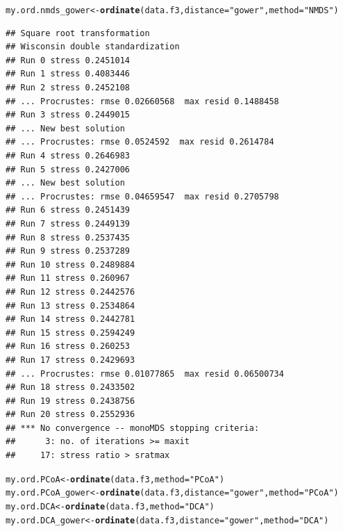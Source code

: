 \documentclass[12pt]{article}\usepackage[]{graphicx}\usepackage[]{color}
\makeatletter
\newcommand{\hlstr}[1]{\textcolor[rgb]{0.192,0.494,0.8}{#1}}%
\newcommand{\hlstd}[1]{\textcolor[rgb]{0.345,0.345,0.345}{#1}}%
\newcommand{\hlkwb}[1]{\textcolor[rgb]{0.69,0.353,0.396}{#1}}%
\newcommand{\hlkwc}[1]{\textcolor[rgb]{0.333,0.667,0.333}{#1}}%
\newcommand{\hlkwd}[1]{\textcolor[rgb]{0.737,0.353,0.396}{\textbf{#1}}}%
\newenvironment{kframe}{%
 \def\at@end@of@kframe{}%
 \ifinner\ifhmode%
  \def\at@end@of@kframe{\end{minipage}}%
  \begin{minipage}{\columnwidth}%
 \fi\fi%
 \def\FrameCommand##1{\hskip\@totalleftmargin \hskip-\fboxsep
 \colorbox{shadecolor}{##1}\hskip-\fboxsep
     \hskip-\linewidth \hskip-\@totalleftmargin \hskip\columnwidth}%
 \MakeFramed {\advance\hsize-\width
   \@totalleftmargin\z@ \linewidth\hsize
   \@setminipage}}%
 {\par\unskip\endMakeFramed%
 \at@end@of@kframe}
\newenvironment{knitrout}{}{} %
\numberwithin{figure}{section}
\makeatother
\begin{document}
\begin{knitrout}\small
{}\color{fgcolor}\begin{kframe}
\begin{alltt}
\hlstd{my.ord.nmds_gower} \hlkwb{<-} \hlkwd{ordinate}\hlstd{(data.f3,} \hlkwc{distance} \hlstd{=} \hlstr{"gower"}\hlstd{,}  \hlkwc{method} \hlstd{=} \hlstr{"NMDS"}\hlstd{)}
\end{alltt}
\begin{verbatim}
## Square root transformation
## Wisconsin double standardization
## Run 0 stress 0.2451014 
## Run 1 stress 0.4083446 
## Run 2 stress 0.2452108 
## ... Procrustes: rmse 0.02660568  max resid 0.1488458 
## Run 3 stress 0.2449015 
## ... New best solution
## ... Procrustes: rmse 0.0524592  max resid 0.2614784 
## Run 4 stress 0.2646983 
## Run 5 stress 0.2427006 
## ... New best solution
## ... Procrustes: rmse 0.04659547  max resid 0.2705798 
## Run 6 stress 0.2451439 
## Run 7 stress 0.2449139 
## Run 8 stress 0.2537435 
## Run 9 stress 0.2537289 
## Run 10 stress 0.2489884 
## Run 11 stress 0.260967 
## Run 12 stress 0.2442576 
## Run 13 stress 0.2534864 
## Run 14 stress 0.2442781 
## Run 15 stress 0.2594249 
## Run 16 stress 0.260253 
## Run 17 stress 0.2429693 
## ... Procrustes: rmse 0.01077865  max resid 0.06500734 
## Run 18 stress 0.2433502 
## Run 19 stress 0.2438756 
## Run 20 stress 0.2552936 
## *** No convergence -- monoMDS stopping criteria:
##      3: no. of iterations >= maxit
##     17: stress ratio > sratmax
\end{verbatim}
\begin{alltt}
\hlstd{my.ord.PCoA} \hlkwb{<-} \hlkwd{ordinate}\hlstd{(data.f3,} \hlkwc{method} \hlstd{=} \hlstr{"PCoA"}\hlstd{)}
\hlstd{my.ord.PCoA_gower} \hlkwb{<-} \hlkwd{ordinate}\hlstd{(data.f3,} \hlkwc{distance} \hlstd{=} \hlstr{"gower"}\hlstd{,} \hlkwc{method} \hlstd{=} \hlstr{"PCoA"}\hlstd{)}
\hlstd{my.ord.DCA} \hlkwb{<-} \hlkwd{ordinate}\hlstd{(data.f3,} \hlkwc{method} \hlstd{=} \hlstr{"DCA"}\hlstd{)}
\hlstd{my.ord.DCA_gower} \hlkwb{<-} \hlkwd{ordinate}\hlstd{(data.f3,} \hlkwc{distance} \hlstd{=} \hlstr{"gower"}\hlstd{,} \hlkwc{method} \hlstd{=} \hlstr{"DCA"}\hlstd{)}


\end{alltt}
\end{kframe}
\end{knitrout}
\end{document}
